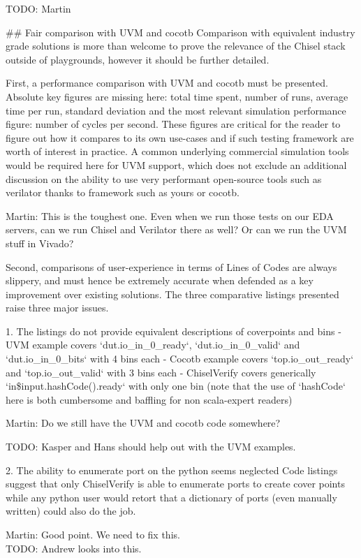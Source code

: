 \documentclass{article}
\newcommand{\todo}[1]{{\color{olive} TODO: #1}}
\newcommand{\martin}[1]{{\color{blue} Martin: #1\\}}
\begin{document}
\todo{Martin}


\#\# Fair comparison with UVM and cocotb
Comparison with equivalent industry grade solutions is more than welcome to prove the relevance of the Chisel stack outside of playgrounds, however it should be further detailed.

First, a performance comparison with UVM and cocotb must be presented.
Absolute key figures are missing here: total time spent, number of runs, average time per run, standard deviation and the most relevant simulation performance figure: number of cycles per second.
These figures are critical for the reader to figure out how it compares to its own use-cases and if such testing framework are worth of interest in practice.
A common underlying commercial simulation tools would be required here for UVM support, which does not exclude an additional discussion on the ability to use very performant open-source tools such as verilator thanks to framework such as yours or cocotb.

\martin{This is the toughest one. Even when we run those tests on our EDA servers, can we run
Chisel and Verilator there as well? Or can we run the UVM stuff in Vivado?}

Second, comparisons of user-experience in terms of Lines of Codes are always slippery, and must hence be extremely accurate when defended as a key improvement over existing solutions.
The three comparative listings presented raise three major issues.

1. The listings do not provide equivalent descriptions of coverpoints and bins
- UVM example covers `dut.io\_in\_0\_ready`, `dut.io\_in\_0\_valid` and `dut.io\_in\_0\_bits` with 4 bins each
- Cocotb example covers `top.io\_out\_ready` and `top.io\_out\_valid` with 3 bins each
- ChiselVerify covers generically `in\${input.hashCode()}.ready` with only one bin (note that the use of `hashCode` here is both cumbersome and baffling for non scala-expert readers)

\martin{Do we still have the UVM and cocotb code somewhere?}

\todo{Kasper and Hans should help out with the UVM examples.}

2. The ability to enumerate port on the python seems neglected
Code listings suggest that only ChiselVerify is able to enumerate ports to create cover points while any python user would retort that a dictionary of ports (even manually written) could also do the job.

\martin{Good point. We need to fix this.}
\todo{Andrew looks into this.}
\end{document}
